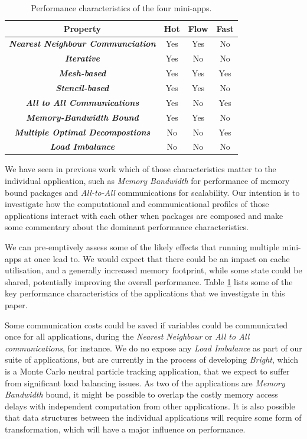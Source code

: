\documentclass[runningheads,a4paper]{llncs}
\begin{document}
\begin{table}[h]
  \begin{center}
    \begin{tabular}{cccc}
      \hline
      \textbf{Property} & \textbf{Hot} & \textbf{Flow} & \textbf{Fast} \\
      \hline
      \textit{\textbf{Nearest Neighbour Communciation}} & Yes & Yes & No  \\
      \textit{\textbf{Iterative}} & Yes & No & No \\
      \textit{\textbf{Mesh-based}} & Yes & Yes & Yes \\
      \textit{\textbf{Stencil-based}} & Yes & Yes & No \\
      \textit{\textbf{All to All Communications}} & Yes & No & Yes \\
      \textit{\textbf{Memory-Bandwidth Bound}} & Yes & Yes & No \\
      \textit{\textbf{Multiple Optimal Decompostions}} & No & No & Yes \\
      \textit{\textbf{Load Imbalance}} & No & No & No \\
    \end{tabular}
  \end{center}
  \caption{Performance characteristics of the four mini-apps.}
  \label{tab:perf-char-mini-apps}
\end{table}

We have seen in previous work which of those characteristics matter to the individual application, such as \textit{Memory Bandwidth} for performance of memory bound packages and \textit{All-to-All} communications for scalability. Our intention is to investigate how the computational and communicational profiles of those applications interact with each other when packages are composed and make some commentary about the dominant performance characteristics.

We can pre-emptively assess some of the likely effects that running multiple mini-apps at once lead to. We would expect that there could be an impact on cache utilisation, and a generally increased memory footprint, while some state could be shared, potentially improving the overall performance. Table \ref{tab:perf-char-mini-apps} lists some of the key performance characteristics of the applications that we investigate in this paper. 

Some communication costs could be saved if variables could be communicated once for all applications, during the \textit{Nearest Neighbour} or \textit{All to All communications}, for instance. We do no expose any \textit{Load Imbalance} as part of our suite of applications, but are currently in the process of developing \textit{Bright}, which is a Monte Carlo neutral particle tracking application, that we expect to suffer from significant load balancing issues. As two of the applications are \textit{Memory Bandwidth} bound, it might be possible to overlap the costly memory access delays with independent computation from other applications. It is also possible that data structures between the individual applications will require some form of transformation, which will have a major influence on performance. 
\end{document}
